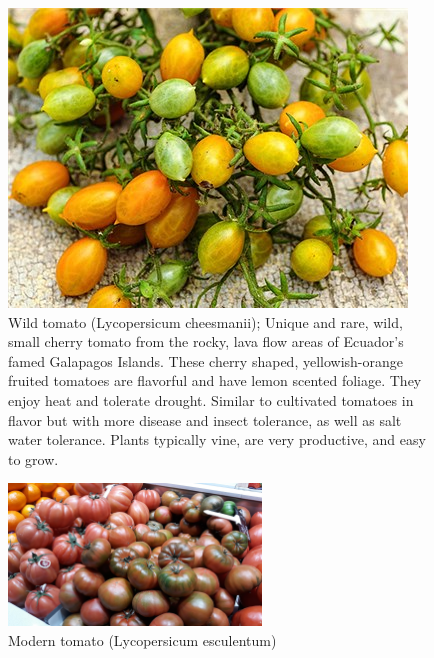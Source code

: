 \documentclass[11pt,ignorenonframetext,aspectratio=169]{beamer}
\begin{document}
\begin{frame}{}
\protect\hypertarget{section-8}{}
\begin{figure}
\includegraphics[width=0.45\linewidth,height=0.4\textheight]{./images/Tomato_galapagos_Solanum-cheesmanii} \caption{Wild tomato (Lycopersicum cheesmanii); Unique and rare, wild, small cherry tomato from the rocky, lava flow areas of Ecuador's famed Galapagos Islands. These cherry shaped, yellowish-orange fruited tomatoes are flavorful and have lemon scented foliage. They enjoy heat and tolerate drought. Similar to cultivated tomatoes in flavor but with more disease and insect tolerance, as well as salt water tolerance. Plants typically vine, are very productive, and easy to grow.}\label{fig:tomato-wild}
\end{figure}

\begin{figure}
\includegraphics[width=0.6\textwidth, keepaspectratio,height=0.4\textheight]{./images/modified_tomatoes} \caption{Modern tomato (Lycopersicum esculentum)}\label{fig:tomato-modern}
\end{figure}
\end{frame}
\end{document}
